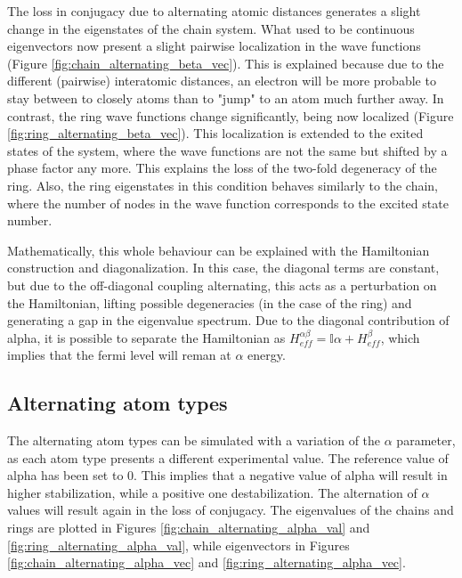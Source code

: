 \documentclass[twocolumn]{article}
\begin{document}
The loss in conjugacy due to alternating atomic distances generates a slight change in the eigenstates of the chain system. What used to be continuous eigenvectors now present a slight pairwise localization in the wave functions (Figure \ref{fig:chain_alternating_beta_vec}). This is explained because due to the different (pairwise) interatomic distances, an electron will be more probable to stay between to closely atoms than to "jump" to an atom much further away. In contrast, the ring wave functions change significantly, being now localized (Figure \ref{fig:ring_alternating_beta_vec}). This localization is extended to the exited states of the system, where the wave functions are not the same but shifted by a phase factor any more. This explains the loss of the two-fold degeneracy of the ring.  Also, the ring eigenstates in this condition behaves similarly to the chain, where the number of nodes in the wave function corresponds to the excited state number.

Mathematically, this whole behaviour can be explained with the Hamiltonian construction and diagonalization. In this case, the diagonal terms are constant, but due to the off-diagonal coupling alternating, this acts as a perturbation on the Hamiltonian, lifting possible degeneracies (in the case of the ring) and generating a gap in the eigenvalue spectrum. Due to the diagonal contribution of alpha, it is possible to separate the Hamiltonian as $H_{eff}^{\alpha\beta} = \mathbb{I} \alpha + H_{eff}^\beta$, which implies that the fermi level will reman at $\alpha$ energy. 

\subsection{Alternating atom types}
The alternating atom types can be simulated with a variation of the $\alpha$ parameter, as each atom type presents a different experimental value. The reference value of alpha has been set to $0$. This implies that a negative value of alpha will result in higher stabilization, while a positive one destabilization. The alternation of $\alpha$ values will result again in the loss of conjugacy. The eigenvalues of the chains and rings are plotted in Figures \ref{fig:chain_alternating_alpha_val} and \ref{fig:ring_alternating_alpha_val}, while eigenvectors in Figures \ref{fig:chain_alternating_alpha_vec} and \ref{fig:ring_alternating_alpha_vec}.
\end{document}
